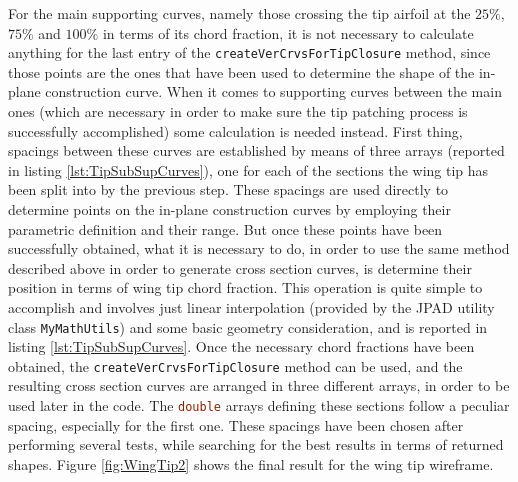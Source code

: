 \bigskip
\noindent
For the main supporting curves, namely those crossing the tip airfoil at the $25\%$, $75\%$ and $100\%$ in terms of its chord fraction, it is not necessary to calculate anything for the last entry of the \lstinline[language=Java]!createVerCrvsForTipClosure! method, since those points are the ones that have been used to determine the shape of the in-plane construction curve. When it comes to supporting curves between the main ones (which are necessary in order to make sure the tip patching process is successfully accomplished) some calculation is needed instead. First thing, spacings between these curves are established by means of three arrays (reported in listing \ref{lst:TipSubSupCurves}), one for each of the sections the wing tip has been split into by the previous step. These spacings are used directly to determine points on the in-plane construction curves by employing their parametric definition and their range. But once these points have been successfully obtained, what it is necessary to do, in order to use the same method described above in order to generate cross section curves, is determine their position in terms of wing tip chord fraction. This operation is quite simple to accomplish and involves just linear interpolation (provided by the \gls{JPAD} utility class \lstinline[language=Java]!MyMathUtils!) and some basic geometry consideration, and is reported in listing \ref{lst:TipSubSupCurves}. Once the necessary chord fractions have been obtained, the \lstinline[language=Java]!createVerCrvsForTipClosure! method can be used, and the resulting cross section curves are arranged in three different arrays, in order to be used later in the code. The \lstinline[language=Java]!double! arrays defining these sections follow a peculiar spacing, especially for the first one. These spacings have been chosen after performing several tests, while searching for the best results in terms of returned shapes. Figure \ref{fig:WingTip2} shows the final result for the wing tip wireframe.
%
\bigskip
